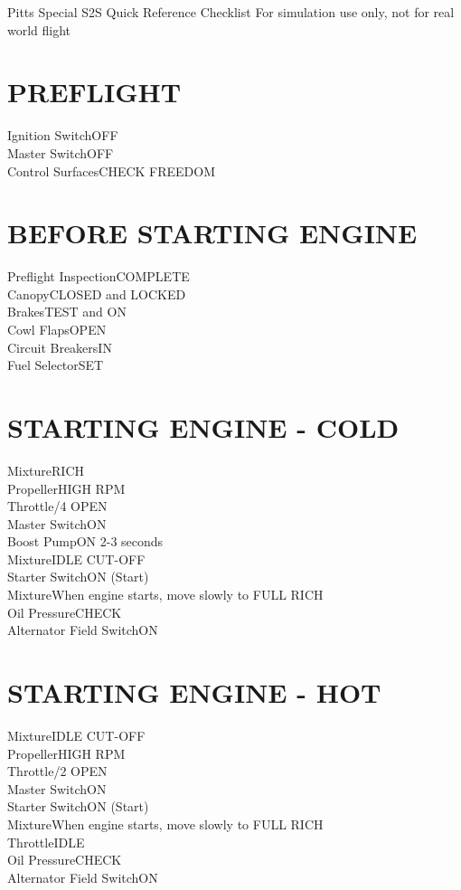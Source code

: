 \documentclass{article}
\begin{document}
\begin{center}
    {\fontsize{25}{70}\selectfont Pitts Special S2S}
    \break
    {\fontsize{20.74}{70}\selectfont Quick Reference Checklist}
    \break
    \color{Red}
    {\fontsize{10}{70}\selectfont For simulation use only, not for real world flight}
\end{center}
\vspace{-2em}
\begin{multicols*}{2}
\section*{PREFLIGHT}
Ignition Switch\dotfill OFF\\
Master Switch\dotfill OFF\\
Control Surfaces\dotfill CHECK FREEDOM
\section*{BEFORE STARTING ENGINE}
Preflight Inspection\dotfill COMPLETE\\
Canopy\dotfill CLOSED and LOCKED\\
Brakes\dotfill TEST and ON\\
Cowl Flaps\dotfill OPEN\\
Circuit Breakers\dotfill IN\\
Fuel Selector\dotfill SET
\section*{STARTING ENGINE - COLD}
Mixture\dotfill RICH\\
Propeller\dotfill HIGH RPM\\
Throttle/4 OPEN\\
Master Switch\dotfill ON\\
Boost Pump\dotfill ON 2-3 seconds\\
Mixture\dotfill IDLE CUT-OFF\\
Starter Switch\dotfill ON (Start)\\
Mixture\dotfill When engine starts, move slowly to FULL RICH\\
Oil Pressure\dotfill CHECK\\
Alternator Field Switch\dotfill ON
\section*{STARTING ENGINE - HOT}
Mixture\dotfill IDLE CUT-OFF\\
Propeller\dotfill HIGH RPM\\
Throttle/2 OPEN\\
Master Switch\dotfill ON\\
Starter Switch\dotfill ON (Start)\\
Mixture\dotfill When engine starts, move slowly to FULL RICH\\
Throttle\dotfill IDLE\\
Oil Pressure\dotfill CHECK\\
Alternator Field Switch\dotfill ON

\end{multicols*}
\end{document}
